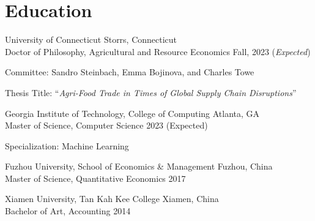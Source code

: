 \documentclass[11 pt,letterpaper]{article}
\renewenvironment{itemize}{
	\begin{list}{}{
			\setlength{\leftmargin}{1.5em}
		}
	}{
	\end{list}
}
\begin{document}
	\section*{\textbf{ Education}}
	\begin{itemize}
		\item[-]  University of Connecticut  \hfill Storrs, Connecticut \\
	 Doctor of Philosophy, Agricultural and Resource Economics  \hfill  Fall, 2023 (\textit{Expected})
	
			
			Committee:	 	 Sandro Steinbach,	Emma Bojinova, and Charles Towe 
			
			Thesis Title: ``\textit{Agri-Food Trade in Times of Global Supply Chain Disruptions}''
			
 
		 
	
		 \item[-]    Georgia Institute of Technology, College of  Computing \hfill   Atlanta, GA   \\ 
		 Master of Science, Computer Science  \hfill      2023 (Expected)
 
	Specialization: Machine Learning
 
		\item[-]  Fuzhou University, School of Economics \& Management \hfill Fuzhou, China \\ 
		Master of Science,   Quantitative Economics  \hfill    2017
		
				
		\item[-]  Xiamen University, Tan Kah Kee College    \hfill  Xiamen, China \\
		Bachelor of Art,  Accounting \hfill    2014
		

\end{itemize}
\end{document}
